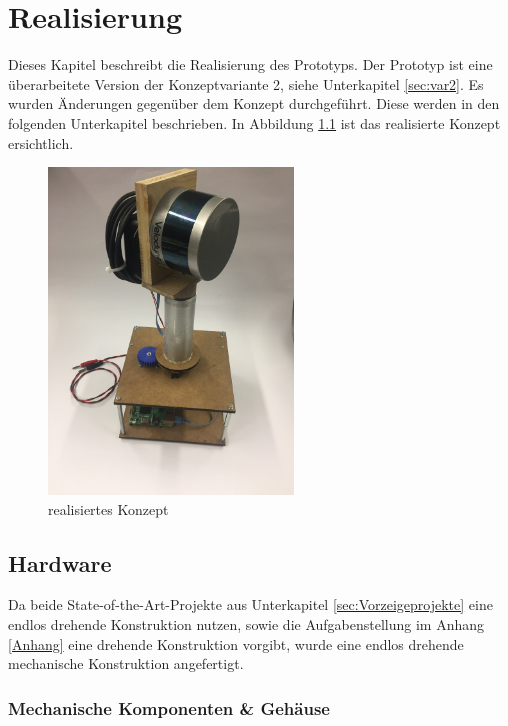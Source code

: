 \chapter{Realisierung}
\label{chap:Realisierung}
Dieses Kapitel beschreibt die Realisierung des Prototyps. Der Prototyp ist eine überarbeitete Version der Konzeptvariante 2, siehe Unterkapitel \ref{sec:var2}. Es wurden Änderungen gegenüber dem Konzept durchgeführt. Diese werden in den folgenden Unterkapitel beschrieben. In Abbildung \ref{fig:Gesamtbild} ist das realisierte Konzept ersichtlich.

\begin{figure}[H]
	\centering
	\includegraphics[angle=-90,width=0.58\textwidth]{resources/Gesamtbild.JPG}
	\caption[realisiertes Konzept]{realisiertes Konzept}
	\label{fig:Gesamtbild}
\end{figure} 


\section {Hardware}
\label{sec:Hardware}

Da beide State-of-the-Art-Projekte aus Unterkapitel \ref{sec:Vorzeigeprojekte} eine endlos drehende Konstruktion nutzen, sowie die Aufgabenstellung im Anhang \ref{Anhang} eine drehende Konstruktion vorgibt, wurde eine endlos drehende mechanische Konstruktion angefertigt. 

\subsection {Mechanische Komponenten \& Gehäuse}
\label{sec:mechKomp}

